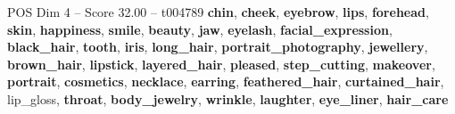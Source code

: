 \begin{textsample}{POS Dim 4 – Score 32.00 – t004789}  \label{ex:f4_pos_003}
\textbf{chin}, \textbf{cheek}, \textbf{eyebrow}, \textbf{lips}, \textbf{forehead}, \textbf{skin}, \textbf{happiness}, \textbf{smile}, \textbf{beauty}, \textbf{jaw}, \textbf{eyelash}, \textbf{facial\_expression}, \textbf{black\_hair}, \textbf{tooth}, \textbf{iris}, \textbf{long\_hair}, \textbf{portrait\_photography}, \textbf{jewellery}, \textbf{brown\_hair}, \textbf{lipstick}, \textbf{layered\_hair}, \textbf{pleased}, \textbf{step\_cutting}, \textbf{makeover}, \textbf{portrait}, \textbf{cosmetics}, \textbf{necklace}, \textbf{earring}, \textbf{feathered\_hair}, \textbf{curtained\_hair}, lip\_gloss, \textbf{throat}, \textbf{body\_jewelry}, \textbf{wrinkle}, \textbf{laughter}, \textbf{eye\_liner}, \textbf{hair\_care}

\end{textsample}
